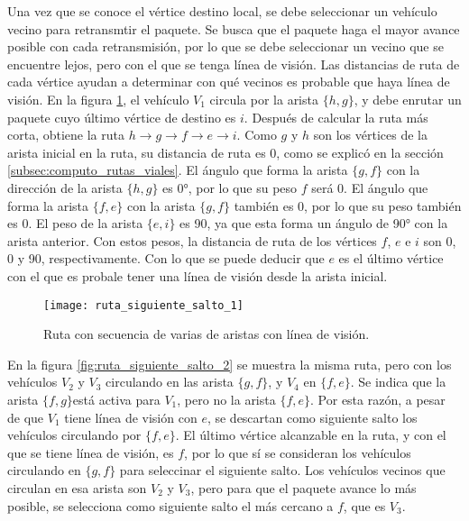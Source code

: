 Una vez que se conoce el vértice destino local, se debe seleccionar un vehículo
vecino para retransmtir el paquete. Se busca que el paquete haga el mayor
avance posible con cada retransmisión, por lo que se debe seleccionar un vecino
que se encuentre lejos, pero con el que se tenga línea de visión. Las
distancias de ruta de cada vértice ayudan a determinar con qué vecinos es
probable que haya línea de visión. En la figura
\ref{fig:ruta_siguiente_salto_1}, el vehículo $V_1$ circula por la arista
$\{h,g\}$, y debe enrutar un paquete cuyo último vértice de destino es $i$.
Después de calcular la ruta más corta, obtiene la ruta $h \rightarrow g
\rightarrow f \rightarrow e \rightarrow i$. Como $g$ y $h$ son los vértices de
la arista inicial en la ruta, su distancia de ruta es 0, como se explicó en la
sección \ref{subsec:computo_rutas_viales}. El ángulo que forma la arista
$\{g,f\}$ con la dirección de la arista $\{h,g\}$ es 0\si{\degree}, por lo que su
peso $f$ será 0. El ángulo que forma la arista $\{f,e\}$ con la arista
$\{g,f\}$ también es 0, por lo que su peso también es 0. El peso de la arista
$\{e,i\}$ es 90, ya que esta forma un ángulo de 90\si{\degree} con la arista
anterior. Con estos pesos, la distancia de ruta de los vértices $f$, $e$ e $i$
son 0, 0 y 90, respectivamente. Con lo que se puede deducir que $e$ es el
último vértice con el que es probale tener una línea de visión desde la arista
inicial.

\begin{figure}[th!]
\centering
\texttt{[image: ruta\_siguiente\_salto\_1]}
\decoRule
\caption[Ruta con secuencia de varias aristas con línea de visión]{Ruta con
secuencia de varias de aristas con línea de visión.}
\label{fig:ruta_siguiente_salto_1}
\end{figure}

En la figura \ref{fig:ruta_siguiente_salto_2} se muestra la misma ruta, pero
con los vehículos $V_2$ y $V_3$ circulando en las arista $\{g,f\}$, y $V_4$ en
$\{f,e\}$. Se indica que la arista $\{f,g\}$está activa para $V_1$,
pero no la arista $\{f,e\}$. Por esta razón, a pesar de que $V_1$ tiene línea
de visión con $e$, se descartan como siguiente salto los vehículos circulando
por $\{f,e\}$. El último vértice alcanzable en la ruta, y con el que se tiene
línea de visión, es $f$, por lo que sí se consideran los vehículos circulando
en $\{g,f\}$ para seleccinar el siguiente salto. Los vehículos vecinos que
circulan en esa arista son $V_2$ y $V_3$, pero para que el paquete avance lo
más posible, se selecciona como siguiente salto el más cercano a $f$, que es
$V_3$.

